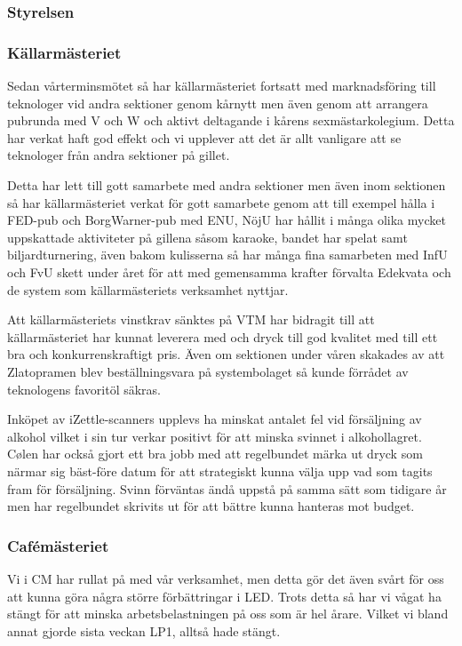 \documentclass[../_main/handlingar.tex]{subfiles}
\begin{document}

\subsubsection*{Styrelsen}


\subsubsection*{Källarmästeriet}

Sedan vårterminsmötet så har källarmästeriet fortsatt med marknadsföring till teknologer vid andra sektioner genom kårnytt men även genom att arrangera pubrunda med V och W och aktivt deltagande i kårens sexmästarkolegium. Detta har verkat haft god effekt och vi upplever att det är allt vanligare att se teknologer från andra sektioner på gillet. 

Detta har lett till gott samarbete med andra sektioner men även inom sektionen så har källarmästeriet verkat för gott samarbete genom att till exempel hålla i FED-pub och BorgWarner-pub med ENU, NöjU har hållit i många olika mycket uppskattade aktiviteter på gillena såsom karaoke, bandet har spelat samt biljardturnering, även bakom kulisserna så har många fina samarbeten med InfU och FvU skett under året för att med gemensamma krafter förvalta Edekvata och de system som källarmästeriets verksamhet nyttjar. 

Att källarmästeriets vinstkrav sänktes på VTM har bidragit till att källarmästeriet har kunnat leverera med och dryck till god kvalitet med till ett bra och konkurrenskraftigt pris. Även om sektionen under våren skakades av att Zlatopramen blev beställningsvara på systembolaget så kunde förrådet av teknologens favoritöl säkras. 

Inköpet av iZettle-scanners upplevs ha minskat antalet fel vid försäljning av alkohol vilket i sin tur verkar positivt för att minska svinnet i alkohollagret. Cølen har också gjort ett bra jobb med att regelbundet märka ut dryck som närmar sig bäst-före datum för att strategiskt kunna välja upp vad som tagits fram för försäljning. Svinn förväntas ändå uppstå på samma sätt som tidigare år men har regelbundet skrivits ut för att bättre kunna hanteras mot budget. 

\subsubsection*{Cafémästeriet}

Vi i CM har rullat på med vår verksamhet, men detta gör det även svårt för oss att kunna göra några större förbättringar i LED. Trots detta så har vi vågat ha stängt för att minska arbetsbelastningen på oss som är hel årare. Vilket vi bland annat gjorde sista veckan LP1, alltså hade stängt. 
\end{document}
